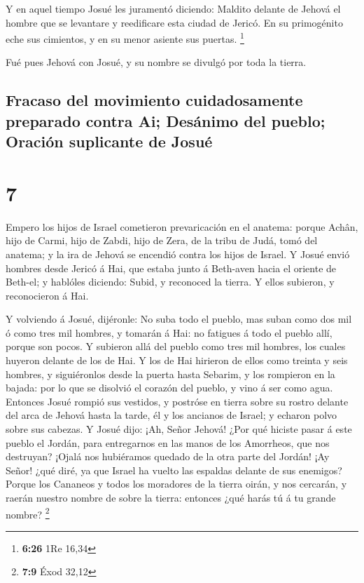  Y en aquel tiempo Josué les juramentó diciendo: Maldito
delante de Jehová el hombre que se levantare y reedificare esta ciudad
de Jericó. En su primogénito eche sus cimientos, y en su menor asiente
sus puertas. \footnote{\textbf{6:26} 1Re 16,34}

 Fué pues Jehová con Josué, y su nombre se divulgó por toda
la tierra.

\hypertarget{fracaso-del-movimiento-cuidadosamente-preparado-contra-ai-desuxe1nimo-del-pueblo-oraciuxf3n-suplicante-de-josuuxe9}{%
\subsection{Fracaso del movimiento cuidadosamente preparado contra Ai;
Desánimo del pueblo; Oración suplicante de
Josué}\label{fracaso-del-movimiento-cuidadosamente-preparado-contra-ai-desuxe1nimo-del-pueblo-oraciuxf3n-suplicante-de-josuuxe9}}

\hypertarget{section-6}{%
\section{7}\label{section-6}}

 Empero los hijos de Israel cometieron prevaricación en el
anatema: porque Achân, hijo de Carmi, hijo de Zabdi, hijo de Zera, de la
tribu de Judá, tomó del anatema; y la ira de Jehová se encendió contra
los hijos de Israel.  Y Josué envió hombres desde Jericó á
Hai, que estaba junto á Beth-aven hacia el oriente de Beth-el; y
hablóles diciendo: Subid, y reconoced la tierra. Y ellos subieron, y
reconocieron á Hai.

 Y volviendo á Josué, dijéronle: No suba todo el pueblo, mas
suban como dos mil ó como tres mil hombres, y tomarán á Hai: no fatigues
á todo el pueblo allí, porque son pocos.  Y subieron allá
del pueblo como tres mil hombres, los cuales huyeron delante de los de
Hai.  Y los de Hai hirieron de ellos como treinta y seis
hombres, y siguiéronlos desde la puerta hasta Sebarim, y los rompieron
en la bajada: por lo que se disolvió el corazón del pueblo, y vino á ser
como agua.  Entonces Josué rompió sus vestidos, y postróse
en tierra sobre su rostro delante del arca de Jehová hasta la tarde, él
y los ancianos de Israel; y echaron polvo sobre sus cabezas.
 Y Josué dijo: ¡Ah, Señor Jehová! ¿Por qué hiciste pasar á
este pueblo el Jordán, para entregarnos en las manos de los Amorrheos,
que nos destruyan? ¡Ojalá nos hubiéramos quedado de la otra parte del
Jordán!  ¡Ay Señor! ¿qué diré, ya que Israel ha vuelto las
espaldas delante de sus enemigos?  Porque los Cananeos y
todos los moradores de la tierra oirán, y nos cercarán, y raerán nuestro
nombre de sobre la tierra: entonces ¿qué harás tú á tu grande nombre?
\footnote{\textbf{7:9} Éxod 32,12}

